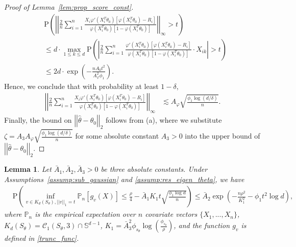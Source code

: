 \documentclass[ejsv2,noshowframe]{imsart}
\theoremstyle{plain}
\newtheorem{lemma}[theorem]{Lemma}
\theoremstyle{definition}
\theoremstyle{remark}
\newcommand{\norm}[1]{\left|\left| #1 \right|\right|}
\renewcommand{\hat}{\widehat}
\begin{document}
\begin{proof}[Proof of Lemma~\ref{lem:prop_score_const}]
	\begin{align*}
		&\mathrm{P}\left(\norm{\frac{2}{n}\sum_{i=1}^n \frac{X_i \varphi'(X_i^T\theta_0)\left[\varphi(X_i^T\theta_0) -R_i \right]}{\varphi(X_i^T\theta_0) \left[1-\varphi(X_i^T\theta_0) \right]}}_{\infty} >t \right) \\
		&\leq d \cdot \max_{1\leq k \leq d} \mathrm{P}\left(\left|\frac{2}{n}\sum_{i=1}^n \frac{\varphi'(X_i^T\theta_0)\left[\varphi(X_i^T\theta_0) -R_i \right]}{\varphi(X_i^T\theta_0) \left[1-\varphi(X_i^T\theta_0) \right]} \cdot X_{ik} \right| > t \right)\\
		&\leq 2d \cdot \exp\left(-\frac{nA_0 t^2}{A_{\varphi}^2 \phi_1} \right).
	\end{align*}
	Hence, we conclude that with probability at least $1-\delta$,
	\begin{align*}
		\norm{\frac{2}{n}\sum_{i=1}^n \frac{X_i \varphi'(X_i^T\theta_0)\left[\varphi(X_i^T\theta_0) -R_i \right]}{\varphi(X_i^T\theta_0) \left[1-\varphi(X_i^T\theta_0) \right]}}_{\infty} &\lesssim A_{\varphi} \sqrt{\frac{\phi_1\log(d/\delta)}{n}}.
	\end{align*}
	Finally, the bound on $\norm{\hat{\theta} - \theta_0}_2$ follows from (a), where we substitute $\zeta = A_3 A_{\varphi} \sqrt{\frac{\phi_1\log(d/\delta)}{n}}$ for some absolute constant $A_3>0$ into the upper bound of $\norm{\hat{\theta} - \theta_0}_2$.
\end{proof}

\vspace{3mm}

\begin{lemma}
	\label{lem:prop_score_cont}
	Let $\bar{A}_1,\bar{A}_2, \bar{A}_3>0$ be three absolute constants. Under Assumptions~\ref{assump:sub_gaussian} and \ref{assump:res_eigen_theta}, we have
	\begin{align*}
		&\mathrm{P}\left(\inf_{v\in K_d(S_{\theta}), \norm{v}_1=t} \mathbb{P}_n\left[g_v(X)\right] \leq \frac{\rho}{4}- \bar{A}_1 K_1 t\sqrt{\frac{\phi_1 \log d}{n}} \right) \leq \bar{A}_2 \exp\left(-\frac{n\rho^2}{K_1^2} - \phi_1 t^2\log d\right),
	\end{align*}
	where $\mathbb{P}_n$ is the empirical expectation over $n$ covariate vectors $\{X_1,...,X_n\}$, $K_d(S_{\theta}) = \mathcal{C}_1(S_{\theta},3) \cap \mathbb{S}^{d-1}$, $K_1=\bar{A}_3^2\phi_{s_{\theta}} \log\left(\frac{\phi_{s_{\theta}}}{\rho}\right)$, and the function $g_v$ is defined in \eqref{trunc_func}. 
\end{lemma}
\end{document}
